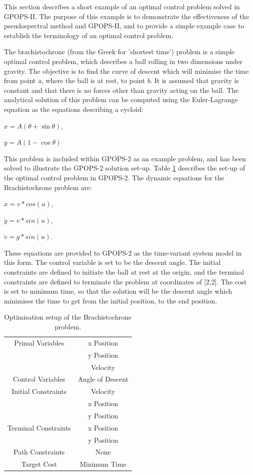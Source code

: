This section describes a short example of an optimal control problem solved in GPOPS-II. The purpose of this example is to demonstrate the effectiveness of the pseudospectral method and GPOPS-II, and to provide a simple example case to establish the terminology of an optimal control problem.  


The brachistochrone (from the Greek for 'shortest time') problem is a simple optimal control problem, which describes a ball rolling in two dimensions under gravity. The objective is to find the curve of descent which will minimise the time from point \textit{a}, where the ball is at rest, to point \textit{b}. It is assumed that gravity is constant and that there is no forces other than gravity acting on the ball. 
The analytical solution of this problem can be computed using the Euler-Lagrange equation as the equations describing a cycloid:

$x = A(\theta + \sin\theta) $,

$y=A(1 - \cos\theta)$

This problem is included within GPOPS-2 as an example problem, and has been solved to illustrate the GPOPS-2 solution set-up\cite{Rao2010}. Table \ref{tab:brachistochrone} describes the set-up of the optimal control problem in GPOPS-2. The dynamic equations for the Brachistochrone problem are:

$\dot{x} = v*cos(u)$,

$\dot{y} = v*sin(u)$,

$\dot{v} = g*sin(u)$.

\noindent These equations are provided to GPOPS-2 as the time-variant system model in this form. The control variable is set to be the descent angle. The initial constraints are defined to initiate the ball at rest at the origin, and the terminal constraints are defined to terminate the problem at coordinates of [2,2]. The cost is set to minimum time, so that the solution will be the descent angle which minimises the time to get from the initial position, to the end position. 

\begin{table}
	\centering
	\begin{tabular}{|c|c|}
		\hline Primal Variables  & x Position\\& y Position\\& Velocity\\ 
		\hline Control Variables  & Angle of Descent\\ 
		\hline Initial Constraints  & Velocity\\ & x Position\\ & y Position\\
		\hline Terminal Constraints &  x Position\\ & y Position\\
		\hline Path Constraints & None \\ 
		\hline Target Cost & Minimum Time \\ 
		\hline 
	\end{tabular} 
	\caption{Optimisation setup of the Brachistochrone problem. }
	\label{tab:brachistochrone}
\end{table}


